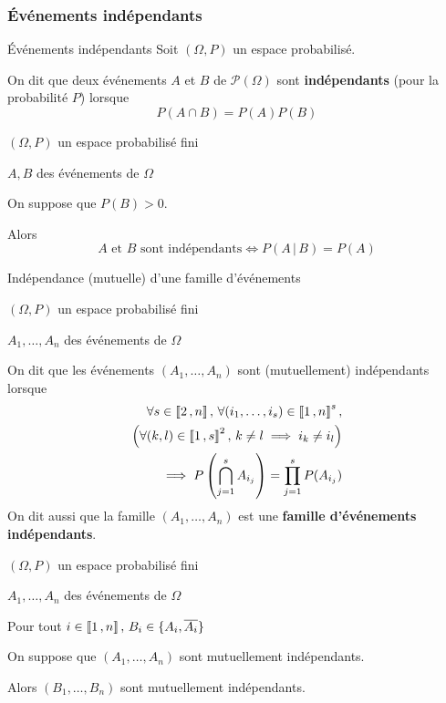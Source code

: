     \subsubsection{Événements indépendants}

    \begin{defi}{Événements indépendants}{}
        Soit $(\Omega, P)$ un espace probabilisé.

        On dit que deux événements $A$ et $B$ de $\mathcal{P}(\Omega)$ sont \textbf{indépendants} (pour la probabilité $P$) lorsque \[ P(A \cap B) = P(A)P(B) \]
    \end{defi}

    \begin{prop}{}{}
        \begin{soient}
            \item $(\Omega,P)$ un espace probabilisé fini
            \item $A,B$ des événements de $\Omega$
        \end{soient}
        On suppose que $P(B) > 0$.

        Alors 
        \[ A \text{ et } B \text{ sont indépendants} \iff P(A\,|\,B) = P(A) \]
    \end{prop}

    \begin{defi}{Indépendance (mutuelle) d’une famille d’événements}{}
        \begin{soient}
            \item $(\Omega,P)$ un espace probabilisé fini
            \item $A_1, \ldots, A_n$ des événements de $\Omega$
        \end{soient}
        On dit que les événements $(A_1 , \ldots, A_n)$ sont (mutuellement) indépendants lorsque 
        \begin{align*}
            \forall s \in \left\llbracket 2 \, , n \right\rrbracket, \, \forall (i_1, \ldots, i_s) \in \left\llbracket 1 \, , n \right\rrbracket^s, \\
            \left( \forall(k,l) \in \left\llbracket 1 \, , s \right\rrbracket^2, \, k \neq l \implies i_k \neq i_l \right) \\
            \implies P \left( \bigcap\limits_{j = 1}^s A_{i_j} \right) = \prod\limits_{j=1}^s P(A_{i_j})
        \end{align*}
        On dit aussi que la famille $(A_1, \ldots, A_n)$ est une \textbf{famille d’événements indépendants}.
    \end{defi}

    \begin{prop}{}{}
        \begin{soient}
            \item $(\Omega,P)$ un espace probabilisé fini
            \item $A_1, \ldots, A_n$ des événements de $\Omega$
            \item Pour tout $i \in \left\llbracket 1 \, , n \right\rrbracket, \, B_i \in \{ A_i, \overline{A_i} \} $
        \end{soient}
        On suppose que $(A_1, \ldots, A_n)$ sont mutuellement indépendants.
    
        Alors $(B_1, \ldots, B_n)$ sont mutuellement indépendants.
    \end{prop}

